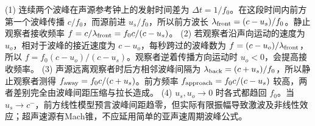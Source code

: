 (1) 连续两个波峰在声源参考钟上的发射时间差为 \(\Delta t=1/f_0\)。在这段时间内前方第一个波峰传播 \(c/f_0\)，而源前进 \(u_s/f_0\)，所以前方波长 \(\lambda_{\rm front}=(c-u_s)/f_0\)。静止观察者接收频率 \(f=c/\lambda_{\rm front}=f_0c/(c-u_s)\)。
(2) 若观察者沿声向运动的速度为 \(u_o\)，相对于波峰的接近速度为 \(c-u_o\)，每秒跨过的波峰数为 \(f=(c-u_o)/\lambda_{\rm front}\)，所以 \(f=f_0(c-u_o)/(c-u_s)\)。观察者逆着传播方向运动时 \(u_o<0\)，会提高接收频率。
(3) 声源远离观察者时后方相邻波峰间隔为 \(\lambda_{\rm back}=(c+u_s)/f_0\)，所以静止观察者测得 \(f_{\rm away}=f_0c/(c+u_s)\)。前方频率 \(f_{\rm approach}=f_0c/(c-u_s)\) 较高，两者差别完全由波峰间距压缩与拉长造成。
(4) \(u_s,u_o\to0\) 时各式都趋回 \(f_0\)。当 \(u_s\to c^-\)，前方线性模型预言波峰间距趋零，但实际有限振幅导致激波及非线性效应；超声速源有Mach锥，不应延用简单的亚声速周期波峰公式。
